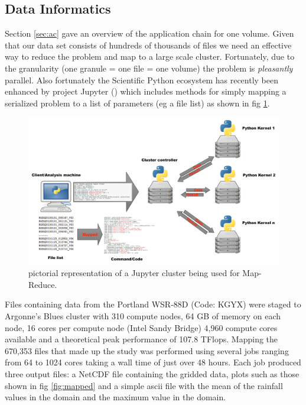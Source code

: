 \documentclass[twocol]{ametsoc}
\begin{document}
\subsection{Data Informatics}
Section \ref{sec:ac} gave an overview of the application chain for one volume. Given that our data set consists of hundreds of thousands of files 
we need an effective way to reduce the problem and map to a large scale cluster. Fortunately, due to the granularity (one granule = one file = one volume) 
the problem is \textit{pleasantly} parallel. Also fortunately the Scientific Python ecosystem has recently been enhanced by project Jupyter (\cite{jupyter})
which includes methods for simply mapping a serialized problem to a list of parameters (eg a file list) as shown in fig \ref{fig:cluster}. 
\begin{figure}[h]
    \centering
    \includegraphics[width=0.95\columnwidth]{cluster.png}
    \caption{pictorial representation of a Jupyter cluster being used for Map-Reduce.  }
    \label{fig:cluster}
\end{figure}

Files containing data from the Portland WSR-88D (Code: KGYX) were staged to Argonne's Blues cluster with 310 compute nodes, 
64 GB of memory on each node, 16 cores per compute node (Intel Sandy Bridge) 4,960 compute cores available and a theoretical
 peak performance of 107.8 TFlops. Mapping the 670,353 files that made up the study was performed using several jobs ranging from
 64 to 1024 cores taking a wall time of just over 48 hours. Each job produced three output files: a NetCDF file containing the gridded data,
 plots such as those shown in fig \ref{fig:mapped} and a simple ascii file with the mean of the rainfall values in the domain and the 
 maximum value in the domain.
 
\end{document}
